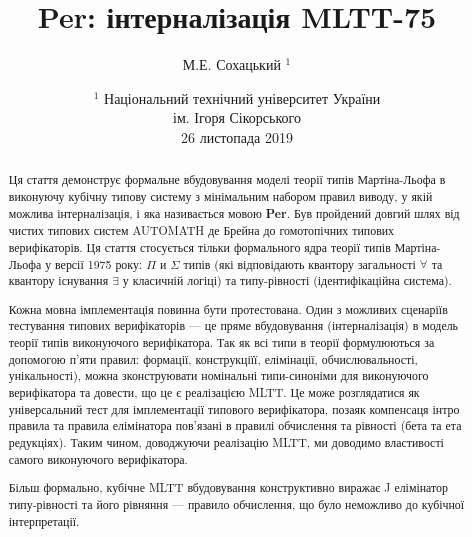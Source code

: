 \documentclass{article}
\begin{document}
\author { М.Е. Сохацький $^1$ }
\title { Per: інтерналізація MLTT-75 }
\date{ \small $^1$ Національний технічний університет України \\
       ім. Ігоря Сікорського \\
       26 листопада 2019 }
\maketitle

\begin{abstract}

Ця стаття демонструє формальне вбудовування моделі теорії типів Мартіна-Льофа
в виконуючу кубічну типову систему з мінімальним набором правил виводу,
у якій можлива інтерналізація, і яка називається мовою {\bf Per}.
Був пройдений довгий шлях від чистих типових систем AUTOMATH де Брейна до
гомотопічних типових верифікаторів. Ця стаття стосується тільки формального ядра
теорії типів Мартіна-Льофа у версії 1975 року: $\Pi$ и $\Sigma$ типів (які відповідають
квантору загальності $\forall$ та квантору існування $\exists$ у класичній логіці)
та типу-рівності (ідентифікаційна система).

Кожна мовна імплементація повинна бути протестована. Один з можливих сценаріїв
тестування типових верифікаторів --- це пряме вбудовування (інтерналізація) в модель теорії типів
виконуючого верифікатора. Так як всі типи в теорії формулюються за допомогою п'яти
правил: формації, конструкціїї, елімінації, обчислювальності, унікальності), можна зконструювати
номінальні типи-синоніми для виконуючого верифікатора та довести, що це є реалізацією MLTT.
Це може розглядатися як універсальний тест для імплементації типового верифікатора,
позаяк компенсаця інтро правила та правила елімінатора пов'язані в правилі
обчислення та рівності (бета та ета редукціях). Таким чином, доводжуючи реалізацію MLTT,
ми доводимо властивості самого виконуючого верифікатора.

Більш формально, кубічне MLTT вбудовування конструктивно виражає
J елімінатор типу-рівності та його рівняння — правило обчислення,
що було неможливо до кубічної інтерпретації.

\end{abstract}
\end{document}
